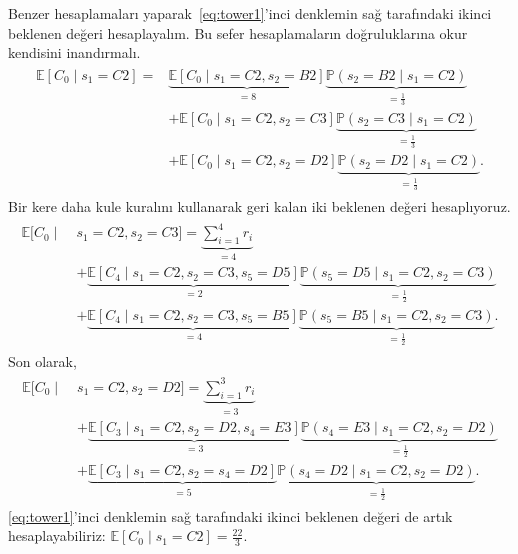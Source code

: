 Benzer hesaplamalar{\i} yaparak~\eqref{eq:tower1}'inci denklemin sa\u{g}
taraf{\i}ndaki ikinci beklenen de\u{g}eri hesaplayal{\i}m. Bu sefer
hesaplamalar{\i}n do\u{g}ruluklar{\i}na okur kendisini inand{\i}rmal{\i}.
%
\begin{align*}
    \begin{split}
    \mathbb{E}\left[ C_0 \mid s_1 = C2 \right] =
    &\underbrace{\mathbb{E}[C_0 \mid s_1 = C2, s_2 = B2]}_{=8} \underbrace{\mathbb{P}(s_2 = B2 \mid s_1 = C2)}_{=\frac{1}{3}} \\
    &+ \mathbb{E}[C_0 \mid s_1=C2, s_2 = C3] \underbrace{\mathbb{P}(s_2 = C3 \mid s_1 = C2)}_{=\frac{1}{3}} \\
    &+ \mathbb{E}[C_0 \mid s_1 = C2, s_2 = D2] \underbrace{\mathbb{P}(s_2 = D2 \mid s_1 = C2)}_{=\frac{1}{3}}.
    \end{split}
\end{align*}
%
Bir kere daha kule kural{\i}n{\i} kullanarak geri kalan iki beklenen de\u{g}eri
hesapl{\i}yoruz.
%
\begin{align*}
    \begin{split}
    \mathbb{E}[C_0 \mid \; &s_1=C2, s_2=C3] = \underbrace{\sum_{i=1}^4 r_i}_{=4} \\
    &+ \underbrace{\mathbb{E}[C_4 \mid s_1=C2, s_2=C3, s_5=D5]}_{=2} \underbrace{\mathbb{P}(s_5=D5 \mid s_1=C2, s_2=C3)}_{=\frac{1}{2}} \\
    &+ \underbrace{\mathbb{E}[C_4 \mid s_1=C2, s_2=C3, s_5=B5]}_{=4} \underbrace{\mathbb{P}(s_5=B5 \mid s_1=C2, s_2=C3)}_{=\frac{1}{2}}.
    \end{split}
\end{align*}
%
Son olarak,
%
\begin{align*}
    \begin{split}
    \mathbb{E}[C_0 \mid \; &s_1=C2, s_2=D2] = \underbrace{\sum_{i=1}^3 r_i}_{=3} \\
    &+ \underbrace{\mathbb{E}[C_3 \mid s_1=C2, s_2=D2, s_4=E3]}_{=3} \underbrace{\mathbb{P}(s_4=E3 \mid s_1=C2, s_2=D2)}_{=\frac{1}{2}} \\
    &+ \underbrace{\mathbb{E}[C_3 \mid s_1=C2, s_2=s_4=D2]}_{=5} \underbrace{\mathbb{P}(s_4=D2 \mid s_1=C2, s_2=D2)}_{=\frac{1}{2}}.
    \end{split}
\end{align*}
%
\eqref{eq:tower1}'inci denklemin sa\u{g} taraf{\i}ndaki ikinci beklenen
de\u{g}eri de art{\i}k hesaplayabiliriz: $\mathbb{E}[C_0 \mid s_1=C2] =
\frac{22}{3}$.
